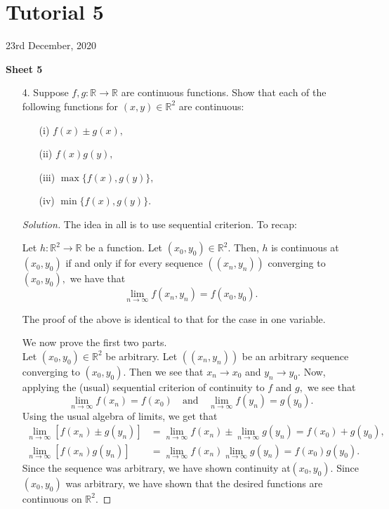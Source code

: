 \documentclass[12pt]{article}
\theoremstyle{definition}
\newenvironment{soln}{\begin{proof}[Solution]}{\end{proof}}
\begin{document}
\newpage\section{Tutorial 5}
\begin{center}
	23rd December, 2020
\end{center}
\textbf{Sheet 5}
\begin{itemize}
	\item[4.] Suppose $f, g : \mathbb{R} \to \mathbb{R}$ are continuous functions. Show that each of the following functions for $(x, y) \in \mathbb{R}^2$ are continuous:
	\begin{itemize}
		\item[(i)] $f(x) \pm g(x),$
		\item[(ii)] $f(x)g(y),$
		\item[(iii)] $\max\{f(x), g(y)\},$
		\item[(iv)] $\min\{f(x), g(y)\}.$
	\end{itemize}
	\begin{soln}
		The idea in all is to use sequential criterion. To recap:

		\begin{thm}
			Let $h:\mathbb{R}^2 \to \mathbb{R}$ be a function. Let $(x_0, y_0) \in \mathbb{R}^2.$ Then, $h$ is continuous at $(x_0, y_0)$ if and only if for every sequence $\left((x_n, y_n)\right)$ converging to $(x_0, y_0),$ we have that
			\begin{equation*} 
				\lim_{n\to \infty}f(x_n, y_n) = f(x_0, y_0).
			\end{equation*}
		\end{thm}

		The proof of the above is identical to that for the case in one variable.

		We now prove the first two parts. \\
		Let $(x_0, y_0) \in \mathbb{R}^2$ be arbitrary. Let $\left((x_n, y_n)\right)$ be an arbitrary sequence converging to $(x_0, y_0).$ Then we see that $x_n \to x_0$ and $y_n \to y_0.$ Now, applying the (usual) sequential criterion of continuity to $f$ and $g,$ we see that
		\begin{equation*} 
			\lim_{n\to \infty}f(x_n) = f(x_0) \quad\text{and}\quad \lim_{n\to \infty}f(y_n) = g(y_0).	
		\end{equation*} 
		Using the usual algebra of limits, we get that
		\begin{align*} 
			\lim_{n\to \infty}[f(x_n) \pm g(y_n)] &= \lim_{n\to \infty}f(x_n) \pm \lim_{n\to \infty}g(y_n) = f(x_0) +	g(y_0),\\
			\lim_{n\to \infty}[f(x_n) g(y_n)] &= \lim_{n\to \infty}f(x_n)\lim_{n\to \infty}g(y_n) = f(x_0)g(y_0).
		\end{align*}
		Since the sequence was arbitrary, we have shown continuity at$(x_0, y_0).$ Since $(x_0, y_0)$ was arbitrary, we have shown that the desired functions are continuous on $\mathbb{R}^2.$


\end{soln}
\end{itemize}
\end{document}
